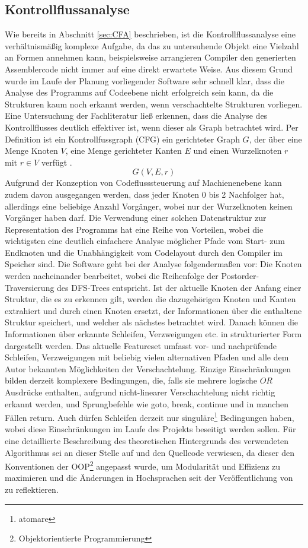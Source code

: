 \documentclass[11pt]{article} %
\begin{document}
\begin{multicols}{2}
\subsection{Kontrollflussanalyse}
Wie bereits in Abschnitt \ref{sec:CFA} beschrieben, ist die Kontrollflussanalyse eine verhältnismäßig komplexe Aufgabe, da das zu untersuhende Objekt eine Vielzahl an Formen annehmen kann, beispielsweise arrangieren Compiler den generierten Assemblercode nicht immer auf eine direkt erwartete Weise. Aus diesem Grund wurde im Laufe der Planung vorliegender Software sehr schnell klar, dass die Analyse des Programms auf Codeebene nicht erfolgreich sein kann, da die Strukturen kaum noch erkannt werden, wenn verschachtelte Strukturen vorliegen. Eine Untersuchung der Fachliteratur ließ erkennen, dass die Analyse des Kontrollflusses deutlich effektiver ist, wenn dieser als Graph betrachtet wird. Per Definition ist ein Kontrollfussgraph (CFG) ein gerichteter Graph \(G\), der über eine Menge Knoten \(V\), eine Menge gerichteter Kanten \(E\) und einen Wurzelknoten \(r\) mit \(r \in V\) verfügt \cite{wiki1:3}. \[G(V,E,r)\] Aufgrund der Konzeption von Codeflusssteuerung auf Machienenebene kann zudem davon ausgegangen werden, dass jeder Knoten 0 bis 2 Nachfolger hat, allerdings eine beliebige Anzahl Vorgänger, wobei nur der Wurzelknoten keinen Vorgänger haben darf. Die Verwendung einer solchen Datenstruktur zur Representation des Programms hat eine Reihe von Vorteilen, wobei die wichtigsten eine deutlich einfachere Analyse möglicher Pfade vom Start- zum Endknoten und die Unabhängigkeit vom Codelayout durch den Compiler im Speicher sind.
Die Software geht bei der Analyse folgendermaßen vor: Die Knoten werden nacheinander bearbeitet, wobei die Reihenfolge der Postorder-Traversierung des DFS-Trees entspricht. Ist der aktuelle Knoten der Anfang einer Struktur, die es zu erkennen gilt, werden die dazugehörigen Knoten und Kanten extrahiert und durch einen Knoten ersetzt, der Informationen über die enthaltene Struktur speichert, und welcher als nächstes betrachtet wird. Danach können die Informationen über erkannte Schleifen, Verzweigungen etc. in strukturierter Form dargestellt werden. Das aktuelle Featureset umfasst vor- und nachprüfende Schleifen, Verzweigungen mit beliebig vielen alternativen Pfaden und alle dem Autor bekannten Möglichkeiten der Verschachtelung. Einzige Einschränkungen bilden derzeit komplexere Bedingungen, die, falls sie mehrere logische \(OR\) Ausdrücke enthalten, aufgrund nicht-linearer Verschachtelung nicht richtig erkannt werden, und Sprungbefehle wie goto, break, continue und in manchen Fällen return. Auch dürfen Schleifen derzeit nur singuläre\footnote{atomare} Bedingungen haben, wobei diese Einschränkungen im Laufe des Projekts beseitigt werden sollen. Für eine detaillierte Beschreibung des theoretischen Hintergrunds des verwendeten Algorithmus sei an dieser Stelle auf \cite{structural_analysis:1} und den Quellcode verwiesen, da dieser den Konventionen der OOP\footnote{Objektorientierte Programmierung} angepasst wurde, um Modularität und Effizienz zu maximieren und die Änderungen in Hochsprachen seit der Veröffentlichung von \cite{structural_analysis:1} zu reflektieren.


\end{multicols}
\end{document}
